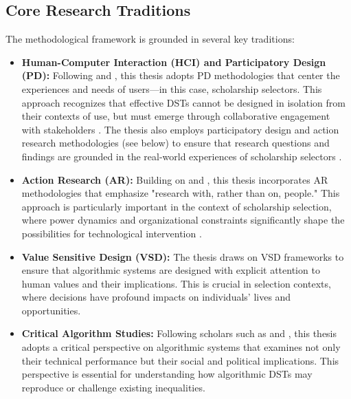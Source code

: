 \subsection{Core Research Traditions}\label{ssec:context_core_traditions}
The methodological framework is grounded in several key traditions:
\begin{itemize}
    \item \textbf{Human-Computer Interaction (HCI) and Participatory Design (PD):} Following \textcite{blythe2014research} and \textcite{Knapp_Zeratzky_Kowitz_2016}, this thesis adopts PD methodologies that center the experiences and needs of users—in this case, scholarship selectors. This approach recognizes that effective DSTs cannot be designed in isolation from their contexts of use, but must emerge through collaborative engagement with stakeholders \cite{braun_using_2006}. The thesis also employs participatory design and action research methodologies (see below) to ensure that research questions and findings are grounded in the real-world experiences of scholarship selectors \cite{hayes2011knowing}.
    \item \textbf{Action Research (AR):} Building on \textcite{Hayes_2011} and \textcite{bradbury_action_2003}, this thesis incorporates AR methodologies that emphasize "research with, rather than on, people." This approach is particularly important in the context of scholarship selection, where power dynamics and organizational constraints significantly shape the possibilities for technological intervention \cite{lu_organizing_2023}.
    \item \textbf{Value Sensitive Design (VSD):} The thesis draws on VSD frameworks \cite{VanKleek_Seymour_Binns_Shadbolt_2018} to ensure that algorithmic systems are designed with explicit attention to human values and their implications. This is crucial in selection contexts, where decisions have profound impacts on individuals' lives and opportunities.
    \item \textbf{Critical Algorithm Studies:} Following scholars such as \textcite{noble2018algorithms} and \textcite{oneill2016weapons}, this thesis adopts a critical perspective on algorithmic systems that examines not only their technical performance but their social and political implications. This perspective is essential for understanding how algorithmic DSTs may reproduce or challenge existing inequalities.
\end{itemize}

